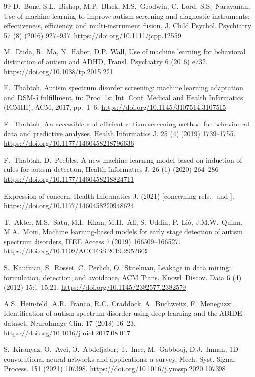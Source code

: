 \documentclass[5p,times,twocolumn]{elsarticle}
\begin{document}
\begin{thebibliography}{99}
D.~Bone, S.L.~Bishop, M.P.~Black, M.S.~Goodwin, C.~Lord, S.S.~Narayanan, Use of machine learning to improve autism screening and diagnostic instruments: effectiveness, efficiency, and multi-instrument fusion, J. Child Psychol. Psychiatry 57 (8) (2016) 927--937. \url{https://doi.org/10.1111/jcpp.12559}

M.~Duda, R.~Ma, N.~Haber, D.P.~Wall, Use of machine learning for behavioral distinction of autism and ADHD, Transl. Psychiatry 6 (2016) e732. \url{https://doi.org/10.1038/tp.2015.221}

F.~Thabtah, Autism spectrum disorder screening: machine learning adaptation and DSM-5 fulfillment, in: Proc. 1st Int. Conf. Medical and Health Informatics (ICMHI), ACM, 2017, pp.~1--6. \url{https://doi.org/10.1145/3107514.3107515}

F.~Thabtah, An accessible and efficient autism screening method for behavioural data and predictive analyses, Health Informatics J. 25 (4) (2019) 1739--1755. \url{https://doi.org/10.1177/1460458218796636}

F.~Thabtah, D.~Peebles, A new machine learning model based on induction of rules for autism detection, Health Informatics J. 26 (1) (2020) 264--286. \url{https://doi.org/10.1177/1460458218824711}

Expression of concern, Health Informatics J. (2021) [concerning refs.\ \cite{thabtah2019} and \cite{thabtah2020}]. \url{https://doi.org/10.1177/1460458220948624}

T.~Akter, M.S.~Satu, M.I.~Khan, M.H.~Ali, S.~Uddin, P.~Li\'o, J.M.W.~Quinn, M.A.~Moni, Machine learning-based models for early stage detection of autism spectrum disorders, IEEE Access 7 (2019) 166509--166527. \url{https://doi.org/10.1109/ACCESS.2019.2952609}

S.~Kaufman, S.~Rosset, C.~Perlich, O.~Stitelman, Leakage in data mining: formulation, detection, and avoidance, ACM Trans. Knowl. Discov. Data 6 (4) (2012) 15:1--15:21. \url{https://doi.org/10.1145/2382577.2382579}

A.S.~Heinsfeld, A.R.~Franco, R.C.~Craddock, A.~Buchweitz, F.~Meneguzzi, Identification of autism spectrum disorder using deep learning and the ABIDE dataset, NeuroImage Clin. 17 (2018) 16--23. \url{https://doi.org/10.1016/j.nicl.2017.08.017}

S.~Kiranyaz, O.~Avci, O.~Abdeljaber, T.~Ince, M.~Gabbouj, D.J.~Inman, 1D convolutional neural networks and applications: a survey, Mech. Syst. Signal Process. 151 (2021) 107398. \url{https://doi.org/10.1016/j.ymssp.2020.107398}


\end{thebibliography}
\end{document}
